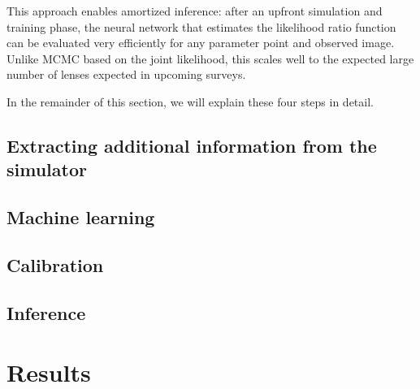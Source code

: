 \documentclass[twocolumn]{aastex62}
\begin{document}
This approach enables amortized inference: after an upfront simulation and training phase, the neural network that estimates the likelihood ratio function can be evaluated very efficiently for any parameter point and observed image. Unlike MCMC based on the joint likelihood, this scales well to the expected large number of lenses expected in upcoming surveys. 

In the remainder of this section, we will explain these four steps in detail.


\subsection{Extracting additional information from the simulator}
\label{sec:lfi-gold}




\subsection{Machine learning}
\label{sec:lfi-ml}




\subsection{Calibration}
\label{sec:lfi-calibration}


\subsection{Inference}
\label{sec:lfi-inference}



\section{Results}
\label{sec:results}

\end{document}
